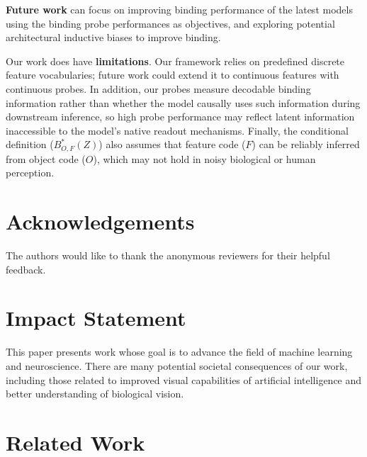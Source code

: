 \documentclass{article}
\theoremstyle{plain}
\theoremstyle{definition}
\theoremstyle{remark}
\begin{document}
 \textbf{Future work} can focus on improving binding performance of the latest models using the binding probe performances as objectives, and exploring potential architectural inductive biases to improve binding.


Our work does have \textbf{limitations}. Our framework relies on predefined discrete feature vocabularies; future work could extend it to continuous features with continuous probes. In addition, our probes measure decodable binding information rather than whether the model causally uses such information during downstream inference, so high probe performance may reflect latent information inaccessible to the model’s native readout mechanisms. Finally, the conditional definition ($B^*_{O,F}(Z)$) also assumes that feature code ($F$) can be reliably inferred from object code ($O$), which may not hold in noisy biological or human perception. 


\section*{Acknowledgements}
The authors would like to thank the anonymous reviewers for their helpful feedback.


\section*{Impact Statement}
This paper presents work whose goal is to advance the field of machine learning and neuroscience. There are many potential societal consequences of our work, including those related to improved visual capabilities of artificial intelligence and better understanding of biological vision.







\newpage
\newpage
\appendix
\onecolumn


\section{Related Work}
\label{sec:relatedwork}
\end{document}
